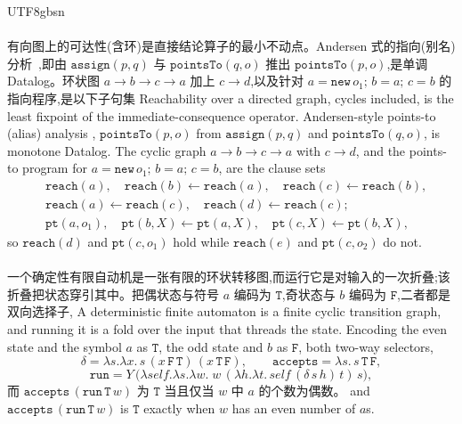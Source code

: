 \begin{CJK*}{UTF8}{gbsn}
  \paragraph{}
  \ifTablambdaChinese 有向图上的可达性(含环)是直接结论算子的最小不动点。Andersen 式的指向(别名)分析~\cite{andersen1994-program-analysis-c, bravenboer2009-doop},即由 $\mathtt{assign}(p,q)$ 与 $\mathtt{pointsTo}(q,o)$ 推出 $\mathtt{pointsTo}(p,o)$,是单调 Datalog。环状图 $a\to b\to c\to a$ 加上 $c\to d$,以及针对 $a=\mathtt{new}\,o_1;\,b=a;\,c=b$ 的指向程序,是以下子句集 \else Reachability over a directed graph, cycles included, is the least fixpoint of the immediate-consequence operator. Andersen-style points-to (alias) analysis \cite{andersen1994-program-analysis-c, bravenboer2009-doop}, $\mathtt{pointsTo}(p,o)$ from $\mathtt{assign}(p,q)$ and $\mathtt{pointsTo}(q,o)$, is monotone Datalog. The cyclic graph $a\to b\to c\to a$ with $c\to d$, and the points-to program for $a=\mathtt{new}\,o_1;\,b=a;\,c=b$, are the clause sets \fi
  \[
    \begin{aligned}
      &\mathtt{reach}(a),\quad \mathtt{reach}(b)\leftarrow\mathtt{reach}(a),\quad
      \mathtt{reach}(c)\leftarrow\mathtt{reach}(b),\\
      &\mathtt{reach}(a)\leftarrow\mathtt{reach}(c),\quad \mathtt{reach}(d)\leftarrow\mathtt{reach}(c);\\
      &\mathtt{pt}(a,o_1),\quad \mathtt{pt}(b,X)\leftarrow\mathtt{pt}(a,X),\quad
      \mathtt{pt}(c,X)\leftarrow\mathtt{pt}(b,X),
    \end{aligned}
  \]
  so $\mathtt{reach}(d)$ and $\mathtt{pt}(c,o_1)$ hold while $\mathtt{reach}(e)$ and $\mathtt{pt}(c,o_2)$ do not.

  \paragraph{}
  \ifTablambdaChinese 一个确定性有限自动机是一张有限的环状转移图,而运行它是对输入的一次折叠;该折叠把状态穿引其中。把偶状态与符号 $a$ 编码为 $\mathtt{T}$,奇状态与 $b$ 编码为 $\mathtt{F}$,二者都是双向选择子, \else A deterministic finite automaton is a finite cyclic transition graph, and running it is a fold over the input that threads the state. Encoding the even state and the symbol $a$ as $\mathtt{T}$, the odd state and $b$ as $\mathtt{F}$, both two-way selectors, \fi
  \[
    \delta = \lambda s.\lambda x.\,s\,(x\,\mathtt{F}\,\mathtt{T})\,(x\,\mathtt{T}\,\mathtt{F}), \qquad
    \mathtt{accepts} = \lambda s.\,s\,\mathtt{T}\,\mathtt{F},
  \]
  \[
    \mathtt{run} = Y\,\big(\lambda\mathit{self}.\lambda s.\lambda w.\;
    w\,(\lambda h.\lambda t.\,\mathit{self}\,(\delta\,s\,h)\,t)\,s\big),
  \]
  \ifTablambdaChinese 而 $\mathtt{accepts}\,(\mathtt{run}\,\mathtt{T}\,w)$ 为 $\mathtt{T}$ 当且仅当 $w$ 中 $a$ 的个数为偶数。 \else and $\mathtt{accepts}\,(\mathtt{run}\,\mathtt{T}\,w)$ is $\mathtt{T}$ exactly when $w$ has an even number of $a$s. \fi


\end{CJK*}
